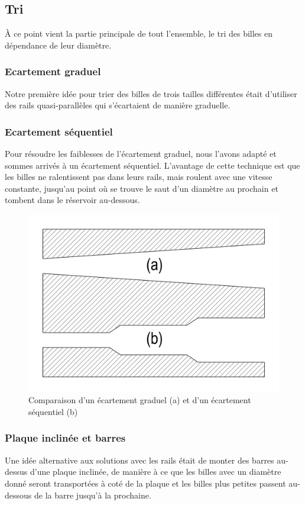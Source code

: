 \subsection{Tri}
À ce point vient la partie principale de tout l'ensemble, le tri des billes en dépendance de leur diamètre.

\subsubsection{Ecartement graduel}
Notre première idée pour trier des billes de trois tailles différentes était d'utiliser des rails quasi-parallèles qui s'écartaient de manière graduelle.

\subsubsection{Ecartement séquentiel}
Pour résoudre les faiblesses de l'écartement graduel, nous l'avons adapté et sommes arrivés à un écartement séquentiel. L'avantage de cette technique est que les billes ne ralentissent pas dans leurs rails, mais roulent avec une vitesse constante, jusqu'au point où se trouve le saut d'un diamètre au prochain et tombent dans le réservoir au-dessous.

\begin{figure}
    \centering
    \includegraphics[width=\textwidth]{Graphics/Rails/ECARTEMENTS.pdf}
    \caption{Comparaison d'un écartement graduel (a) et d'un écartement séquentiel (b)}
\end{figure}

\subsubsection{Plaque inclinée et barres}
Une idée alternative aux solutions avec les rails était de monter des barres au-dessus d'une plaque inclinée, de manière à ce que les billes avec un diamètre donné seront transportées à coté de la plaque et les billes plus petites passent au-dessous de la barre jusqu'à la prochaine.

